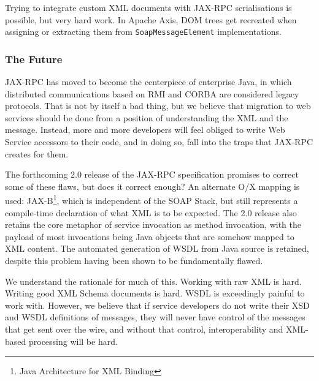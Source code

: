  Trying to integrate custom
XML documents with JAX-RPC serialisations is possible, but very hard
work. In Apache Axis, DOM trees get recreated when assigning or
extracting them from {\tt SoapMessageElement} implementations.


\subsubsection{The Future}
\label{objections:implications:future}

JAX-RPC has moved to become the centerpiece of enterprise Java, in
which distributed communications based on RMI and CORBA are considered
legacy protocols. That is not by itself a bad thing, but we believe
that migration to web services should be done from a position of
understanding the XML and the message. Instead, more and more
developers will feel obliged to write Web Service accessors to their
code, and in doing so, fall into the traps that JAX-RPC creates for
them.

The forthcoming 2.0 release of the JAX-RPC specification promises to
correct some of these flaws, but does it correct enough? An alternate
O/X mapping is used: JAX-B\footnote{Java Architecture for XML
Binding}, which is independent of the SOAP Stack, but still represents
a compile-time declaration of what XML is to be expected. The 2.0
release also retains the core metaphor of service invocation as method
invocation, with the payload of most invocations being Java objects
that are somehow mapped to XML content. The automated generation of
WSDL from Java source is retained, despite this problem having been
shown to be fundamentally flawed.

We understand the rationale for much of this. Working with raw XML is
hard.  Writing good XML Schema documents is hard. WSDL is exceedingly
painful to work with. However, we believe that if service developers do not write
their XSD and WSDL definitions of messages, they will never have
control of the messages that get sent over the wire, and without that
control, interoperability and XML-based processing will be hard.

